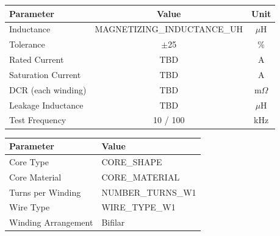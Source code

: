 \documentclass[10pt,a4paper]{article}
\begin{document}
\begin{minipage}[t]{0.32\textwidth}

\noindent{\normalsize\bfseries\textcolor{wurthred}{Electrical Specifications}}
\vspace{1mm}

{\scriptsize
\begin{tabular}{|p{2.2cm}|c|c|}
\hline
\rowcolor{tableheader}
\textbf{Parameter} & \textbf{Value} & \textbf{Unit} \\
\hline
Inductance & {{MAGNETIZING_INDUCTANCE_UH}} & $\mu$H \\
\hline
Tolerance & $\pm$25 & \% \\
\hline
Rated Current & TBD & A \\
\hline
Saturation Current & TBD & A \\
\hline
DCR (each winding) & TBD & m$\Omega$ \\
\hline
Leakage Inductance & TBD & $\mu$H \\
\hline
Test Frequency & 10 / 100 & kHz \\
\hline
\end{tabular}
}

\vspace{3mm}

\noindent{\normalsize\bfseries\textcolor{wurthred}{Core \& Winding}}
\vspace{1mm}

{\scriptsize
\begin{tabular}{|l|l|}
\hline
\rowcolor{tableheader}
\textbf{Parameter} & \textbf{Value} \\
\hline
Core Type & {{CORE_SHAPE}} \\
\hline
Core Material & {{CORE_MATERIAL}} \\
\hline
Turns per Winding & {{NUMBER_TURNS_W1}} \\
\hline
Wire Type & {{WIRE_TYPE_W1}} \\
\hline
Winding Arrangement & Bifilar \\
\hline
\end{tabular}
}

\end{minipage}
\hfill
\end{document}
